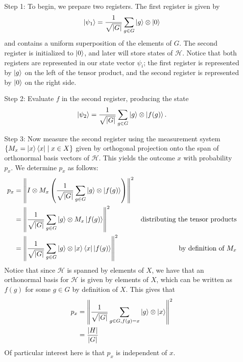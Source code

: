 \documentclass{article}
\renewcommand{\bra}{\Bra}
\renewcommand{\ket}{\Ket}
\theoremstyle{plain}
\theoremstyle{centered}
\renewcommand{\bra}{\Bra}
\renewcommand{\ket}{\Ket}
\newcommand{\abs}[1]{\left\lvert #1 \right\rvert}
\newcommand{\norm}[1]{\left\lVert #1 \right\rVert}
\renewcommand{\cal}[1]{\mathcal{#1}}
\begin{document}
        \begin{enumerate}
        \item[Step 1:]
            To begin, we prepare two registers. The first register is given by 
                $$\ket{\psi_1} = \frac{1}{\sqrt{\abs{G}}} \sum_{g \in G} \ket{g} \otimes \ket{0}$$
            and contains a uniform superposition of the elements of $G$. 
            The second register is initialized to $\ket{0}$, and later will store states of $\cal{H}$.
            Notice that both registers are represented in our state vector $\psi_i$; the first register is represented by $\ket{g}$ on the left of the tensor product, and the second register is represented by $\ket{0}$ on the right side.

        \item[Step 2:]
            Evaluate $f$ in the second register, producing the state
                $$\ket{\psi_2} = \frac{1}{\sqrt{\abs{G}}} \sum_{g \in G} \ket{g} \otimes \ket{f(g)}.$$

        \item[Step 3:]
            Now measure the second register using the measurement system $\{M_x = \ket{x}\bra{x} \mid x \in X\}$ given by orthogonal projection onto the span of orthonormal basis vectors of $\cal{H}$.
            This yields the outcome $x$ with probability $p_x$.
            We determine $p_x$ as follows:
            \begin{align*}
            p_x &= \norm{I \otimes M_x \left(\frac{1}{\sqrt{\abs{G}}} \sum_{g \in G} \ket{g} \otimes \ket{f(g)}\right)}^2\\
            &= \norm{\frac{1}{\sqrt{\abs{G}}} \sum_{g \in G} \ket{g} \otimes M_x \ket{f(g)}}^2 & \text{distributing the tensor products}\\
            &= \norm{\frac{1}{\sqrt{\abs{G}}} \sum_{g \in G} \ket{g} \otimes \ket{x} \bra{x} \ket{f(g)}}^2 & \text{by definition of $M_x$}
            \end{align*}
            Notice that since $\cal{H}$ is spanned by elements of $X$, we have that an orthonormal basis for $\cal{H}$ is given by elements of $X$, which can be written as $f(g)$ for some $g \in G$ by definition of $X$.
            This gives that 
            \begin{align*}
            p_x &= \norm{\frac{1}{\sqrt{\abs{G}}} \sum_{g \in G, f(g) = x} \ket{g} \otimes \ket{x}}^2\\
            &= \frac{\abs{H}}{\abs{G}}
            \end{align*}
            Of particular interest here is that $p_x$ is independent of $x$.


\end{enumerate}
\end{document}
